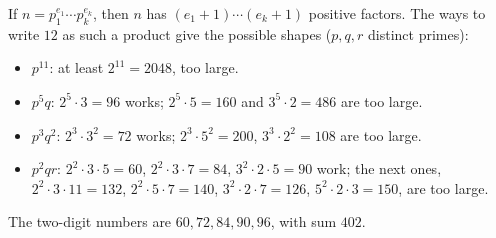If $n=p_1^{e_1}\cdots p_k^{e_k}$, then $n$ has $(e_1+1)\cdots(e_k+1)$ positive factors. The ways to write $12$ as such a product give the possible shapes ($p,q,r$ distinct primes):
\begin{itemize}
\item $p^{11}$: at least $2^{11}=2048$, too large.
\item $p^5q$: $2^5\cdot3=96$ works; $2^5\cdot5=160$ and $3^5\cdot2=486$ are too large.
\item $p^3q^2$: $2^3\cdot3^2=72$ works; $2^3\cdot5^2=200$, $3^3\cdot2^2=108$ are too large.
\item $p^2qr$: $2^2\cdot3\cdot5=60$, $2^2\cdot3\cdot7=84$, $3^2\cdot2\cdot5=90$ work; the next ones, $2^2\cdot3\cdot11=132$, $2^2\cdot5\cdot7=140$, $3^2\cdot2\cdot7=126$, $5^2\cdot2\cdot3=150$, are too large.
\end{itemize}
The two-digit numbers are $60,72,84,90,96$, with sum $\boxed{402}$.
